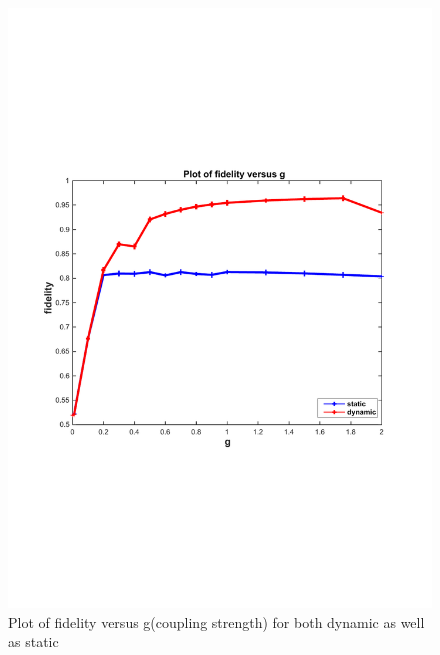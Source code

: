 \begin{center}
\begin{figure}%
\includegraphics[width=1.1\textwidth]{F_both_in_one}
\caption{Plot of fidelity versus g(coupling strength) for both dynamic as well as static}
\label{F_both_in_one}
\end{figure}
\end{center}


